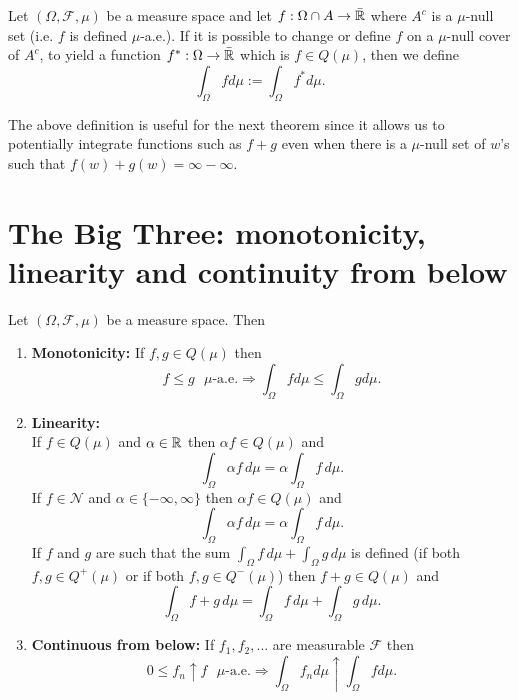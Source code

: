 \begin{definition}
Let $(\Omega, \mathcal F, \mu)$ be a measure space and let $f: \Omega\cap A \rightarrow \bar{\Bbb R}$ where $A^c$ is a $\mu$-null set (i.e. $f$ is defined $\mu$-a.e.). If it is possible to change or define $f$ on a $\mu$-null cover of $A^c$, to yield a function $f^*:\Omega\rightarrow \bar{\Bbb R}$ which is $f\in Q(\mu)$, then we define
\[  \int_{\Omega} f d\mu:= \int_{\Omega} f^* d\mu. \]
\end{definition}


\begin{remark}
The above definition is useful for the next theorem since it allows us to potentially  integrate functions such as $f+g$ even when there is a $\mu$-null set of $w$'s such that $f(w)+ g(w)=\infty - \infty$.
\end{remark}



\section{The Big Three: monotonicity, linearity and continuity from below}






\begin{theorem} Let $(\Omega, \mathcal F, \mu)$ be a measure space. Then
\begin{enumerate}
\item {\bf Monotonicity:} If $f, g \in Q(\mu)$ then
\[ \text{$f\leq g$ $\mu$-a.e.}\Longrightarrow \int_\Omega fd\mu\leq \int_\Omega g d\mu.  \]
\item {\bf Linearity:}\\
If $f\in Q(\mu)$ and $\alpha \in \Bbb R$ then $\alpha f\in Q(\mu)$ and
\[
\int_\Omega \alpha f \,d\mu =  \alpha \int_\Omega f\,d\mu.
\]
If $f\in \mathscr N$ and $\alpha \in \{-\infty, \infty\}$ then $\alpha f\in Q(\mu)$ and
\[
\int_\Omega \alpha f \,d\mu =  \alpha \int_\Omega f\,d\mu.
\]
If $f$ and $g$ are such that the sum $ \int_\Omega f\,d\mu + \int_\Omega g\,d\mu$ is defined (if both $f,g\in Q^+(\mu)$ or if both $f,g \in Q^-(\mu)$) then \mbox{$f+g\in Q(\mu)$} and
\[
\int_\Omega f +  g \,d\mu =  \int_\Omega f\,d\mu + \int_\Omega g\,d\mu.
\]


\item {\bf Continuous from below:} If $f_1, f_2,\ldots$ are measurable $\mathcal F$ then
\[ \text{$0\leq f_n\uparrow f$ $\mu$-a.e.}\Longrightarrow \int_\Omega f_nd\mu\uparrow \int_\Omega f d\mu.  \]
\end{enumerate}
\end{theorem}

